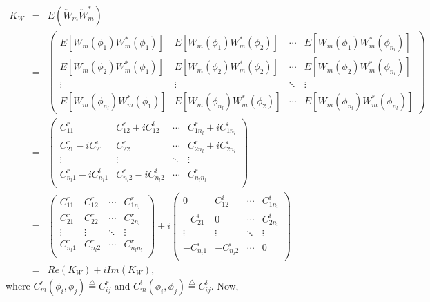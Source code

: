 	\begin{eqnarray*}
		K_W & = & E(\utilde{W}_m\utilde{W}_m^*) \\
		& = &\left(\begin{array}{cccc}
		E[W_m(\phi_1) W_m^*(\phi_1) ] & E[W_m(\phi_1) W_m^*(\phi_2) ]  & \cdots & E[W_m(\phi_1) W_m^*(\phi_{n_l}) ]\\
		E[W_m(\phi_2) W_m^*(\phi_1) ] & E[W_m(\phi_2) W_m^*(\phi_2) ]  & \cdots & E[W_m(\phi_2) W_m^*(\phi_{n_l}) ]\\
		\vdots & \vdots  & \ddots & \vdots \\
		E[W_m(\phi_{n_l}) W_m^*(\phi_1) ] & E[W_m(\phi_{n_l}) W_m^*(\phi_2) ]  & \cdots & E[W_m(\phi_{n_l}) W_m^*(\phi_{n_l})]
		\end{array}
		\right)\\
		& = &\left(\begin{array}{cccc}
		C_{11}^r & C_{12}^r+iC_{12}^i & \cdots & C_{1n_l}^r+iC_{1n_l}^i\\
		C_{21}^r-iC_{21}^i & C_{22}^r & \cdots & C_{2n_l}^r+iC_{2n_l}^i\\
		\vdots & \vdots  & \ddots & \vdots \\
		C_{n_l1}^r-iC_{n_l1}^i & C_{n_l2}^r-iC_{n_l2}^i & \cdots & C_{n_ln_l}^r\\
		\end{array}
		\right) \\
		& = &\left(\begin{array}{cccc}
		C_{11}^r & C_{12}^r & \cdots & C_{1n_l}^r\\
		C_{21}^r & C_{22}^r & \cdots & C_{2n_l}^r\\
		\vdots & \vdots  & \ddots & \vdots \\
		C_{n_l1}^r & C_{n_l2}^r & \cdots & C_{n_ln_l}^r\\
		\end{array}
		\right) + i
		\left(\begin{array}{cccc}
		0 & C_{12}^i & \cdots & C_{1n_l}^i\\
		-C_{21}^i & 0 & \cdots & C_{2n_l}^i\\
		\vdots & \vdots  & \ddots & \vdots \\
		-C_{n_l1}^i & -C_{n_l2}^i & \cdots &  0\\
		\end{array}
		\right)\\
		&=& Re(K_W) + iIm(K_W), 
	\end{eqnarray*}
where $C_m^r(\phi_i, \phi_j) \overset{\bigtriangleup}{=}  C_{ij}^r$ and $C_m^i(\phi_i, \phi_j) \overset{\bigtriangleup}{=}  C_{ij}^i$. Now,
